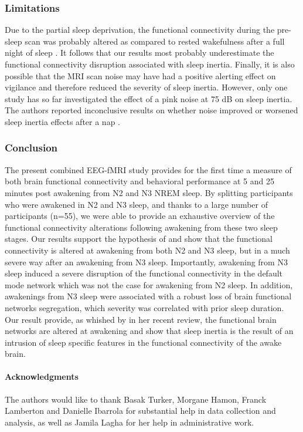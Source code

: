 \subsubsection*{Limitations}
Due to the partial sleep deprivation, the functional connectivity during the pre-sleep scan was probably altered as compared to rested wakefulness after a full night of sleep \citep{samann_increased_2010, de_havas_sleep_2012, yeo_functional_2015, kaufmann_brain_2015, tushaus_resisting_2017}. It follows that our results most probably underestimate the functional connectivity disruption associated with sleep inertia. Finally, it is also possible that the MRI scan noise may have had a positive alerting effect on vigilance and therefore reduced the severity of sleep inertia. However, only one study has so far investigated the effect of a pink noise at 75 dB on sleep inertia. The authors reported inconclusive results on whether noise improved or worsened sleep inertia effects after a nap \citep{tassi_effects_1992}.

\subsubsection*{Conclusion}
The present combined EEG-fMRI study provides for the first time a measure of both brain functional connectivity and behavioral performance at 5 and 25 minutes post awakening from N2 and N3 NREM sleep. By splitting participants who were awakened in N2 and N3 sleep, and thanks to a large number of participants (n=55), we were able to provide an exhaustive overview of the functional connectivity alterations following awakening from these two sleep stages. Our results support the hypothesis of \citet{balkin_process_2002} and show that the functional connectivity is altered at awakening from both N2 and N3 sleep, but in a much severe way after an awakening from N3 sleep. Importantly, awakening from N3 sleep induced a severe disruption of the functional connectivity in the default mode network which was not the case for awakening from N2 sleep. In addition, awakenings from N3 sleep were associated with a robust loss of brain functional networks segregation, which severity was correlated with prior sleep duration. Our result provide, as whished by \citet{trotti_waking_2016} in her recent review, the  functional brain networks are altered at awakening and show that sleep inertia is the result of an intrusion of sleep specific features in the functional connectivity of the awake brain.

\paragraph{Acknowledgments}
The authors would like to thank Basak Turker, Morgane Hamon, Franck Lamberton and Danielle Ibarrola for substantial help in data collection and analysis, as well as Jamila Lagha for her help in administrative work.

